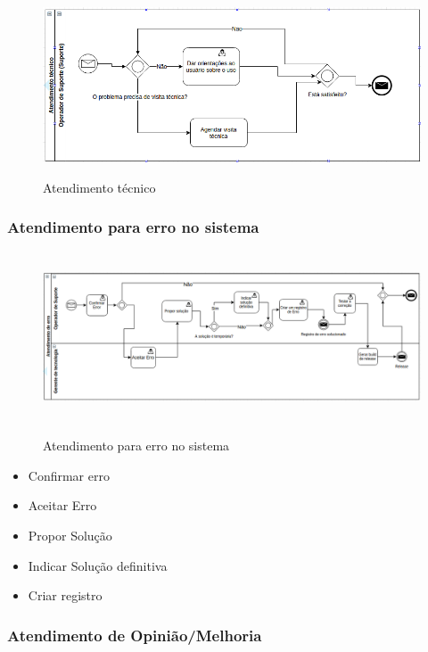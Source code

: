 \begin{figure}[!h]
\caption{Atendimento técnico}
\centering %
\includegraphics[width=15cm]{as-is/02_atendimento_tecnico.png}
\label{figura:suporte_tecnico_as_is}
\end{figure}

\subsubsection{Atendimento para erro no sistema}

\begin{figure}[!h]
\caption{Atendimento para erro no sistema}
\centering %
\includegraphics[width=16cm, height=5cm]{as-is/03_atendimento_de_erro.png}
\label{figura:atendimento_de_erro_as_is}
\end{figure}
\begin{itemize}
	\item Confirmar erro
	\item Aceitar Erro
	\item Propor Solução
	\item Indicar Solução definitiva
	\item Criar registro
\end{itemize}

\subsubsection{Atendimento de Opinião/Melhoria}

